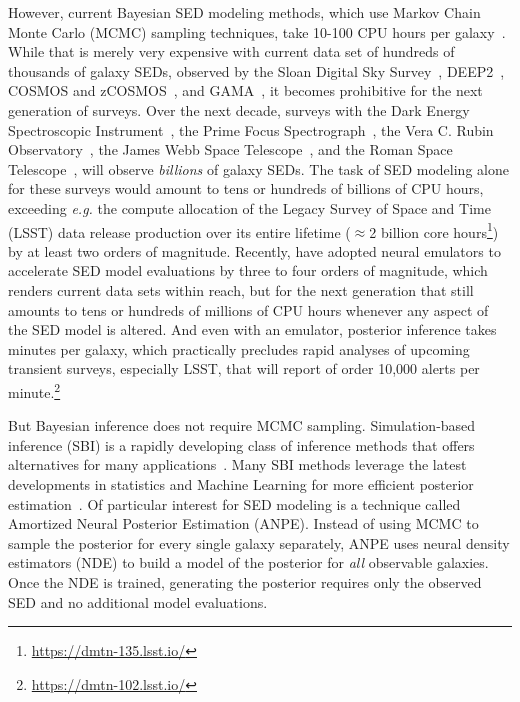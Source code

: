 However, current Bayesian SED modeling methods, which use Markov Chain Monte
Carlo (MCMC) sampling techniques, take 10-100 CPU hours per
galaxy~\citep[\emph{e.g.}][]{carnall2019a, tacchella2021}. 
While that is merely very expensive with current data set of hundreds of thousands of 
galaxy SEDs, observed by the Sloan Digital Sky Survey~\citep[SDSS;][]{york2000},
DEEP2~\citep{davis2003}, COSMOS and zCOSMOS~\citep{scoville2007, lilly2007},
and GAMA~\citep{baldry2018}, it becomes prohibitive for the next generation of surveys.
Over the next decade, surveys with the 
Dark Energy Spectroscopic Instrument~\citep[DESI;][]{desicollaboration2016},
the Prime Focus Spectrograph~\citep[PFS;][]{takada2014}, 
the Vera C. Rubin Observatory~\citep{ivezic2019}, 
the James Webb Space Telescope~\citep{gardner2006},
and the Roman Space Telescope~\citep{spergel2015}, will observe \emph{billions}
of galaxy SEDs.
The task of SED modeling alone for these surveys would amount to tens or
hundreds of billions of CPU hours, exceeding \emph{e.g.} the compute allocation
of the Legacy Survey of Space and Time (LSST) data release production  
over its entire lifetime ($\approx$2 billion core hours\footnote{\url{https://dmtn-135.lsst.io/}}) 
by at least two orders of magnitude.
Recently, \cite{alsing2020} have adopted neural emulators to accelerate SED model
evaluations by three to four orders of magnitude, which renders
current data sets within reach, but for the next generation that still amounts to tens or 
hundreds of millions of  CPU hours whenever any aspect of the SED model is altered.
And even with an emulator, posterior inference takes minutes per galaxy, 
which practically precludes rapid analyses of upcoming transient surveys, especially LSST, that will 
report of order 10,000 alerts per minute.\footnote{\url{https://dmtn-102.lsst.io/}}

But Bayesian inference does not require MCMC sampling.  
Simulation-based inference (SBI) is a rapidly developing class of inference
methods that offers alternatives for many applications~\citep[see][and
references therein]{cranmer2020}.
Many SBI methods leverage the latest developments in statistics and Machine
Learning for more efficient posterior estimation~\citep{papamakarios2017,
alsing2019a, hahn2019c, dax2021, huppenkothen2021, zhang2021}. 
Of particular interest for SED modeling is a technique called Amortized
Neural Posterior Estimation (ANPE). 
Instead of using MCMC to sample the posterior for every single galaxy
separately, ANPE uses neural density estimators (NDE) to build a model of the
posterior for \emph{all} observable galaxies.
Once the NDE is trained, generating the posterior requires only the observed
SED and no additional model evaluations.

